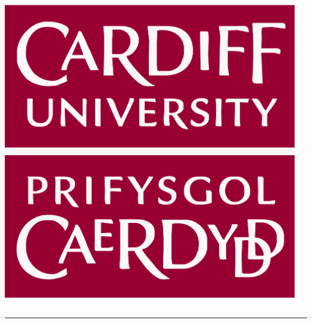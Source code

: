 \documentclass[usenames,dvipsnames,t]{beamer}
\begin{document}
\begin{columns}
\begin{column}{.1\linewidth}
        \begin{center}
            \includegraphics[width=.7\textwidth]{static/cardiff_uni_logo}
        \end{center}
        \end{column}

    \begin{column}{.02\linewidth}
    \end{column}
\end{columns}
\vspace{.5cm}

\hrule height 3pt

\vspace{1cm}
\end{document}
